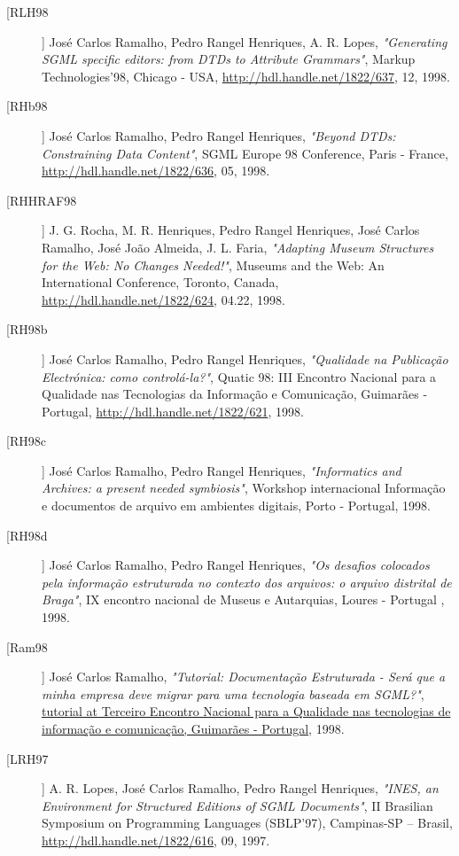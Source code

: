 \begin{description}
\item[[RLH98]]
    \textsf{José Carlos Ramalho, Pedro Rangel Henriques, A. R. Lopes}, \emph{"Generating SGML specific editors: from DTDs to Attribute Grammars"}, Markup Technologies'98, Chicago - USA, \url{http://hdl.handle.net/1822/637}, 12, 1998.

\item[[RHb98]]
    \textsf{José Carlos Ramalho, Pedro Rangel Henriques}, \emph{"Beyond DTDs: Constraining Data Content"}, SGML Europe 98 Conference, Paris - France, \url{http://hdl.handle.net/1822/636}, 05, 1998.

\item[[RHHRAF98]]
    \textsf{J. G. Rocha, M. R. Henriques, Pedro Rangel Henriques, José Carlos Ramalho, José João Almeida, J. L. Faria}, \emph{"Adapting Museum Structures for the Web: No Changes Needed!"}, Museums and the Web: An International Conference, Toronto, Canada, \url{http://hdl.handle.net/1822/624}, 04.22, 1998.

\item[[RH98b]]
    \textsf{José Carlos Ramalho, Pedro Rangel Henriques}, \emph{"Qualidade na Publicação Electrónica: como controlá-la?"}, Quatic 98: III Encontro Nacional para a Qualidade nas Tecnologias da Informação e Comunicação, Guimarães - Portugal, \url{http://hdl.handle.net/1822/621}, 1998.

\item[[RH98c]]
    \textsf{José Carlos Ramalho, Pedro Rangel Henriques}, \emph{"Informatics and Archives: a present needed symbiosis"}, Workshop internacional Informação e documentos de arquivo em ambientes digitais, Porto - Portugal, 1998.

\item[[RH98d]]
    \textsf{José Carlos Ramalho, Pedro Rangel Henriques}, \emph{"Os desafios colocados pela informação estruturada no contexto dos arquivos: o arquivo distrital de Braga"}, IX encontro nacional de Museus e Autarquias, Loures - Portugal , 1998.

\item[[Ram98]]
    \textsf{José Carlos Ramalho}, \emph{"Tutorial: Documentação Estruturada - Será que a minha empresa deve migrar para uma tecnologia baseada em SGML?"}, \url{tutorial at Terceiro Encontro Nacional para a Qualidade nas tecnologias de informação e comunicação, Guimarães - Portugal}, 1998.

\item[[LRH97]]
    \textsf{A. R. Lopes, José Carlos Ramalho, Pedro Rangel Henriques}, \emph{"INES, an Environment for Structured Editions of SGML Documents"}, II Brasilian Symposium on Programming Languages (SBLP'97), Campinas-SP -- Brasil, \url{http://hdl.handle.net/1822/616}, 09, 1997.


\end{description}
